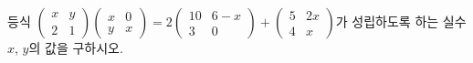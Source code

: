 등식 $\begin{pmatrix} x & y \\ 2 & 1 \end{pmatrix}\begin{pmatrix} x & 0 \\ y & x \end{pmatrix}=2\begin{pmatrix} 10 & 6-x \\ 3 & 0 \end{pmatrix}+\begin{pmatrix} 5 & 2x \\ 4 & x \end{pmatrix}$가 성립하도록 하는 실수 $x$, $y$의 값을 구하시오.
